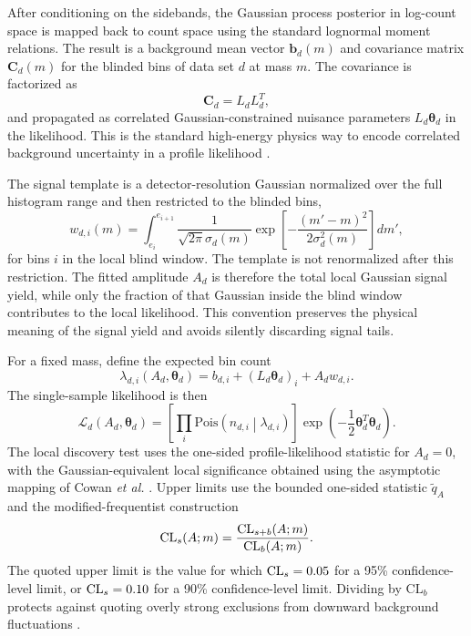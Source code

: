 After conditioning on the sidebands, the Gaussian process posterior in log-count space
is mapped back to count space using the standard lognormal moment relations. The
result is a background mean vector $\bm{b}_d(m)$ and covariance matrix
$\bm{C}_d(m)$ for the blinded bins of data set $d$ at mass $m$. The covariance is
factorized as
\begin{equation}
\bm{C}_d=L_dL_d^T,
\end{equation}
and propagated as correlated Gaussian-constrained nuisance parameters
$L_d\bm{\theta}_d$ in the likelihood. This is the standard high-energy physics way to
encode correlated background uncertainty in a profile likelihood
\cite{HistFactory,Cowan2011}.

The signal template is a detector-resolution Gaussian normalized over the full
histogram range and then restricted to the blinded bins,
\begin{equation}
w_{d,i}(m)=
\int_{e_i}^{e_{i+1}}
\frac{1}{\sqrt{2\pi}\sigma_d(m)}
\exp\left[-\frac{(m'-m)^2}{2\sigma_d^2(m)}\right]dm',
\end{equation}
for bins $i$ in the local blind window. The template is not renormalized after this
restriction. The fitted amplitude $A_d$ is therefore the total local Gaussian signal
yield, while only the fraction of that Gaussian inside the blind window contributes to
the local likelihood. This convention preserves the physical meaning of the signal
yield and avoids silently discarding signal tails.

For a fixed mass, define the expected bin count
\begin{equation}
\lambda_{d,i}(A_d,\bm{\theta}_d)=
b_{d,i}+(L_d\bm{\theta}_d)_i+A_dw_{d,i}.
\end{equation}
The single-sample likelihood is then
\begin{equation}
\mathcal{L}_d(A_d,\bm{\theta}_d)=
\left[
\prod_i \mathrm{Pois}\left(n_{d,i}\middle|\lambda_{d,i}\right)
\right]
\exp\left(-\frac{1}{2}\bm{\theta}_d^T\bm{\theta}_d\right).
\label{eq:single-likelihood}
\end{equation}
The local discovery test uses the one-sided profile-likelihood statistic for
$A_d=0$, with the Gaussian-equivalent local significance obtained using the asymptotic
mapping of Cowan \textit{et al.} \cite{Cowan2011}. Upper limits use the bounded
one-sided statistic $\tilde q_A$ and the modified-frequentist construction
\begin{equation}
\mathrm{CL}_{s}(A;m)=\frac{\mathrm{CL}_{s+b}(A;m)}{\mathrm{CL}_{b}(A;m)}.
\end{equation}
The quoted upper limit is the value for which $\mathrm{CL}_{s}=0.05$ for a 95\% confidence-level
limit, or $\mathrm{CL}_{s}=0.10$ for a 90\% confidence-level limit. Dividing by
$\mathrm{CL}_b$ protects against quoting overly strong exclusions from downward
background fluctuations \cite{Junk1999,Read2002}.

